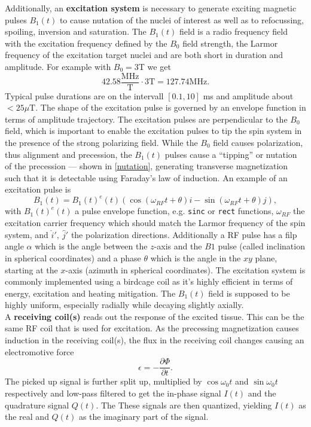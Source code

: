 Additionally, an \textbf{excitation system} is necessary to generate exciting magnetic pulses $B_1(t)$ to cause nutation of the nuclei of interest as well as to refocussing, spoiling, inversion and saturation.
The $B_1(t)$ field is a radio frequency field with the excitation frequency defined by the $B_0$ field strength, the Larmor frequency of the excitation target nuclei and are both short in duration and amplitude.
For example with $B_0 = 3$T we get
\[ 42.58 \frac{\text{MHz}}{\text{T}} \cdot 3 \text{T} = 127.74 \text{MHz}. \]
Typical pulse durations are on the intervall $[0.1, 10]$ ms and amplitude about $< 25 \mu \text{T}$.
The shape of the excitation pulse is governed by an envelope function in terms of amplitude trajectory.
The excitation pulses are perpendicular to the $B_0$ field, which is important to enable the excitation pulses to tip the spin system in the presence of the strong polarizing field.
While the $B_0$ field causes polarization, thus alignment and precession, the $B_1(t)$ pulses cause a ``tipping'' or nutation of the precession --- shown in \ref{nutation}, generating transverse magnetization such that it is detectable using Faraday's law of induction.
An example of an excitation pulse is
\[ B_1(t) = B_1(t)^e (t) \left(\cos\left(\omega_{RF} t + \theta \right) i - \sin\left(\omega_{RF} t + \theta \right) j \right), \]
with $B_1(t)^e (t)$ a pulse envelope function, e.g. \texttt{sinc} or \texttt{rect} functions, $\omega_{RF}$ the excitation carrier frequency which should match the Larmor frequency of the spin system, and $\hat{i}', \ \hat{j}'$ the polarization directions.
Additionally a RF pulse has a filp angle $\alpha$ which is the angle between the $z$-axis and the $B1$ pulse (called inclination in spherical coordinates) and a phase $\theta$ which is the angle in the $xy$ plane, starting at the $x$-axis (azimuth in spherical coordinates).
The excitation system is commonly implemented using a birdcage coil as it's highly efficient in terms of energy, excitation and  heating mitigation.
The $B_1(t)$ field is supposed to be highly uniform, especially radially while decaying slightly axially. \\

A \textbf{receiving coil(s)} reads out the response of the excited tissue.
This can be the same RF coil that is used for excitation.
As the precessing magnetization causes induction in the receiving coil(s), the flux in the receiving coil changes causing an electromotive force
\[ \epsilon = - \frac{\partial \Phi}{\partial t}. \]
The picked up signal is further split up, multiplied by $\cos{\omega_0 t}$ and $\sin{\omega_0 t}$ respectively and low-pass filtered to get the in-phase signal $I(t)$ and the quadrature signal $Q(t)$.
The These signals are then quantized, yielding $I(t)$ as the real and $Q(t)$ as the imaginary part of the signal.

